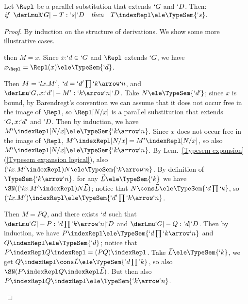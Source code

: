 \documentclass{lmcs}
\newcommand{\vect}[1]{\vec{#1}}
\begin{document}

 \begin{lem} \label{lem:replacement}
Let $ \Repl $ be a parallel substitution that extends $`G$ and $`D $.
Then:
%
 $ \begin{array}{@{}rcl}
 \textit{if }~ \derLmuR `G |- T : `s | `D &\textit{then}& T \indexRepl \ele \TypeSem{`s}. 
 \end{array} $
 \end{lem}


 \begin{proof}
By induction on the structure of derivations. 
We show some more illustrative cases. 

 \begin{description} \itemsep 4pt

 \item[$\Ax$] then $M = x$.
Since $x{:}`d \in`G$ and $\Repl $ extends $`G$, we have $x_{\Repl} = \Repl (x) \ele \TypeSem{`d}$.



 \item [$\Abs$] Then $M = `lx.M'$, $`d = `d'\prod `k\arrow`n $, and $ \derLmu `G,x{:}`d' |- M' : `k\arrow`n | `D $.
Take $N \ele \TypeSem{`d'}$; since $x$ is bound, by Barendregt's convention we can assume that it does not occur free in the image of $ \Repl $, so $ \Repl [ N/x ] $ is a %
parallel substitution that extends $`G, x{:}`d'$ and $`D$.
Then by induction, we have $M'{\indexRepl [ N/x ]} \ele \TypeSem{`k\arrow`n}$.
Since $x$ does not occur free in the image of $ \Repl $, $M'{\indexRepl [ N/x ] } = M'{\indexRepl}[N/x]$, so also $M'{\indexRepl}[N/x] \ele \TypeSem{`k\arrow`n}$.
%
By Lem.~\ref{Typesem expansion}\,(\ref{Typesem expansion logical}), also
$(`lx.M'{\indexRepl})N \ele \TypeSem{`k\arrow`n}$.
By definition of $ \TypeSem{`k\arrow`n}$, for any $ \vect{L} \ele \TypeSem{`k}$ we have $\SN({ (`lx.M'{\indexRepl} )N \vect{L} })$; notice that $N \cons \vect{L} \ele \TypeSem{`d \prod `k}$, so
$(`lx.M'){\indexRepl} \ele \TypeSem{`d'\prod `k\arrow`n}$.



 \item[$\App$]
Then $M = PQ$, and there exists $`d$ such that $ \derLmu `G |- P : `d\prod `k\arrow`n | `D $ and $ \derLmu `G |- Q : `d | `D $.
Then by induction, we have $P{\indexRepl} \ele \TypeSem{`d\prod `k\arrow`n}$ and $Q{\indexRepl} \ele \TypeSem{`d}$; notice that $P{\indexRepl}Q{\indexRepl} = (PQ){\indexRepl}$.
Take $ \vect{L} \ele \TypeSem{`k}$, we get $Q{\indexRepl} \cons \vect{L} \ele \TypeSem{`d\prod `k}$, so also $ \SN( P{\indexRepl}Q{\indexRepl} \vect{L} ) $.
But then also $P{\indexRepl}Q{\indexRepl} \ele \TypeSem{`k\arrow `n}$.



\end{description}
\end{proof}
\end{document}
